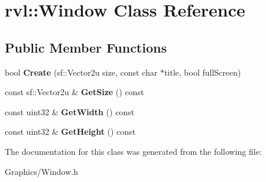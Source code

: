 \hypertarget{classrvl_1_1_window}{}\section{rvl\+:\+:Window Class Reference}
\label{classrvl_1_1_window}
\subsection*{Public Member Functions}
\begin{DoxyCompactItemize}
\item 
\mbox{\label{classrvl_1_1_window_afdd7957b70cc47072c521e5a3f4affb8}} 
bool {\bfseries Create} (sf\+::\+Vector2u size, const char $\ast$title, bool full\+Screen)
\item 
\mbox{\label{classrvl_1_1_window_adf0dfa18d5d6f180ea0e05b34903a657}} 
const sf\+::\+Vector2u \& {\bfseries Get\+Size} () const
\item 
\mbox{\label{classrvl_1_1_window_a7a929cc1744c3b2548be9bbc4166e205}} 
const uint32 \& {\bfseries Get\+Width} () const
\item 
\mbox{\label{classrvl_1_1_window_acca4f280ab176716aef954e14ee5c2d4}} 
const uint32 \& {\bfseries Get\+Height} () const
\end{DoxyCompactItemize}


The documentation for this class was generated from the following file\+:\begin{DoxyCompactItemize}
\item 
Graphics/Window.\+h\end{DoxyCompactItemize}
